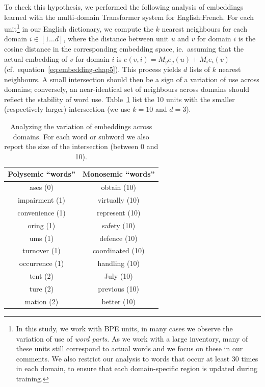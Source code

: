 To check this hypothesis, we performed the following analysis of embeddings learned with the multi-domain Transformer system for English:French. For each unit\footnote{In this study, we work with BPE units, in many cases we observe the variation of use of \emph{word parts}. As we work with a large inventory, many of these units still correspond to actual words and we focus on these in our comments. We also restrict our analysis to words that occur at least 30 times in each domain, to ensure that each domain-specific region is updated during training.} in our English dictionary, we compute the $k$ nearest neighbours for each domain $i \in [1\dots{}d]$, where the distance between unit $u$ and $v$ for domain $i$ is the cosine distance in the corresponding embedding space, ie.\ assuming that the actual embedding of $v$ for domain $i$ is $e(v,i) = M_ge_g(u) + M_ie_i(v)$ (cf.\ equation~\eqref{eq:embedding-chap5}). This process yields $d$ lists of $k$ nearest neighbours. A small intersection should then be a sign of a variation of use across domains; conversely, an near-identical set of neighbours across domains should reflect the stability of word use. Table~\ref{tab:embeddings-chap5} list the 10 units with the smaller (respectively larger) intersection (we use $k=10$ and $d=3$). 

\begin{table}[h]
  \centering
  \begin{tabular}{c|c}
    Polysemic ``words'' & Monosemic ``words'' \\ \hline
     ases (0) &               obtain (10) \\       
     impairment (1) &     virtually (10) \\    
     convenience (1) &    represent (10) \\    
     oring (1) &              safety (10) \\       
     ums (1) &               defence (10) \\      
     turnover (1) &         coordinated (10) \\  
     occurrence (1) &     handling (10) \\     
     tent (2) &               July (10) \\         
     ture (2) &               previous (10) \\     
     mation (2) &           better (10) \\ \hline
  \end{tabular}
  \caption{Analyzing the variation of embeddings across domains. For each word or subword we also report the size of the intersection (between 0 and 10).}
  \label{tab:embeddings-chap5}
\end{table}

